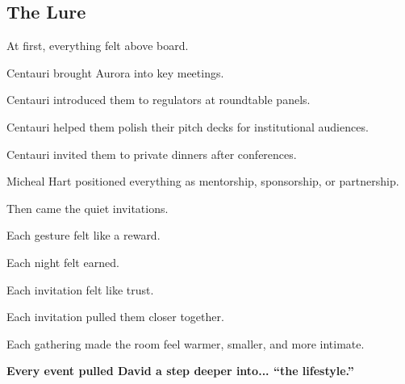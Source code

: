 \subsection{The Lure}

At first, everything felt above board.

Centauri brought Aurora into key meetings.  

Centauri introduced them to regulators at roundtable panels.  

Centauri helped them polish their pitch decks for institutional audiences.  

Centauri invited them to private dinners after conferences.

Micheal Hart positioned everything as mentorship, sponsorship, or partnership.

Then came the quiet invitations.

Each gesture felt like a reward. 

Each night felt earned. 

Each invitation felt like trust.

Each invitation pulled them closer together. 

Each gathering made the room feel warmer, smaller, and more intimate.  

\textbf{Every event pulled David a step deeper into... ``the lifestyle.''}

\medskip

